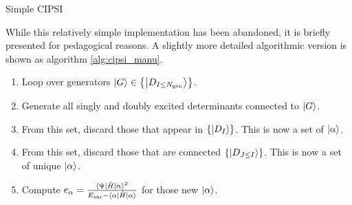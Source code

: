 \documentclass[./thesis.tex]{subfiles}
\begin{document}
\begin{algorithm}
        \caption{Simple CIPSI}
        \label{alg:cipsi_manu}
\end{algorithm}

While this relatively simple implementation has been abandoned, it is briefly presented for pedagogical reasons. A slightly more detailed algorithmic version is shown as algorithm \ref{alg:cipsi_manu}.

\begin{enumerate}
\item Loop over generators $\ket{G} \in \left \{ \ket{D_{I \le {N_\text{gen}}}} \right \}$.
\item
Generate all singly and doubly excited determinants connected to $\ket G$.
\item
From this set, discard those that appear in $\{ \ket{D_{I}} \}$. This is now a set of $\ket \alpha$.
\item
From this set, discard those that are connected $\{ \ket{D_{J\le I}} \}$. This is now a set of unique $\ket \alpha$.
\item
Compute $e_\alpha = \frac{\mel{\Psi}{\hat{H}}{\alpha}^2}{E_\text{var} - \mel{\alpha}{\hat{H}}{\alpha}}$ for those new $\ket \alpha$.
\end{enumerate}
\end{document}

